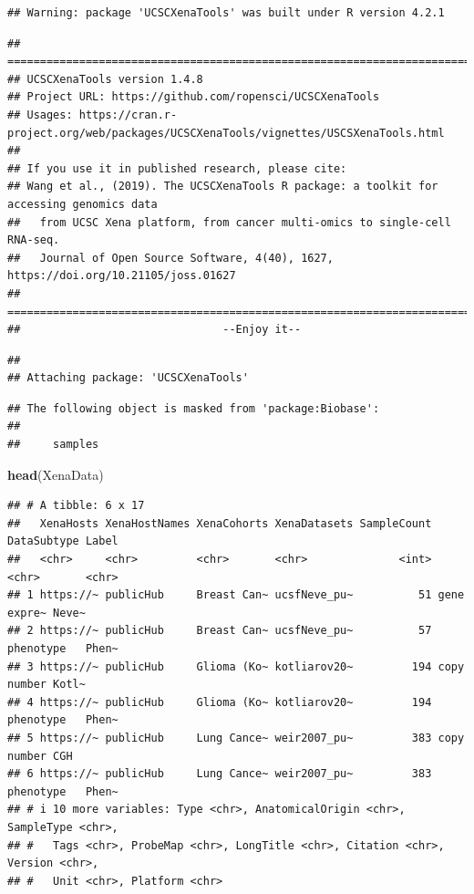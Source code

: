 \documentclass[
  12pt,
]{book}
\newenvironment{Shaded}{\begin{snugshade}}{\end{snugshade}}
\newcommand{\FunctionTok}[1]{\textcolor[rgb]{0.13,0.29,0.53}{\textbf{#1}}}
\newcommand{\NormalTok}[1]{#1}
\begin{document}
\begin{verbatim}
## Warning: package 'UCSCXenaTools' was built under R version 4.2.1
\end{verbatim}

\begin{verbatim}
## =========================================================================================
## UCSCXenaTools version 1.4.8
## Project URL: https://github.com/ropensci/UCSCXenaTools
## Usages: https://cran.r-project.org/web/packages/UCSCXenaTools/vignettes/USCSXenaTools.html
## 
## If you use it in published research, please cite:
## Wang et al., (2019). The UCSCXenaTools R package: a toolkit for accessing genomics data
##   from UCSC Xena platform, from cancer multi-omics to single-cell RNA-seq.
##   Journal of Open Source Software, 4(40), 1627, https://doi.org/10.21105/joss.01627
## =========================================================================================
##                               --Enjoy it--
\end{verbatim}

\begin{verbatim}
## 
## Attaching package: 'UCSCXenaTools'
\end{verbatim}

\begin{verbatim}
## The following object is masked from 'package:Biobase':
## 
##     samples
\end{verbatim}

\begin{Shaded}
\begin{Highlighting}[]
\FunctionTok{head}\NormalTok{(XenaData)}
\end{Highlighting}
\end{Shaded}

\begin{verbatim}
## # A tibble: 6 x 17
##   XenaHosts XenaHostNames XenaCohorts XenaDatasets SampleCount DataSubtype Label
##   <chr>     <chr>         <chr>       <chr>              <int> <chr>       <chr>
## 1 https://~ publicHub     Breast Can~ ucsfNeve_pu~          51 gene expre~ Neve~
## 2 https://~ publicHub     Breast Can~ ucsfNeve_pu~          57 phenotype   Phen~
## 3 https://~ publicHub     Glioma (Ko~ kotliarov20~         194 copy number Kotl~
## 4 https://~ publicHub     Glioma (Ko~ kotliarov20~         194 phenotype   Phen~
## 5 https://~ publicHub     Lung Cance~ weir2007_pu~         383 copy number CGH  
## 6 https://~ publicHub     Lung Cance~ weir2007_pu~         383 phenotype   Phen~
## # i 10 more variables: Type <chr>, AnatomicalOrigin <chr>, SampleType <chr>,
## #   Tags <chr>, ProbeMap <chr>, LongTitle <chr>, Citation <chr>, Version <chr>,
## #   Unit <chr>, Platform <chr>
\end{verbatim}
\end{document}
